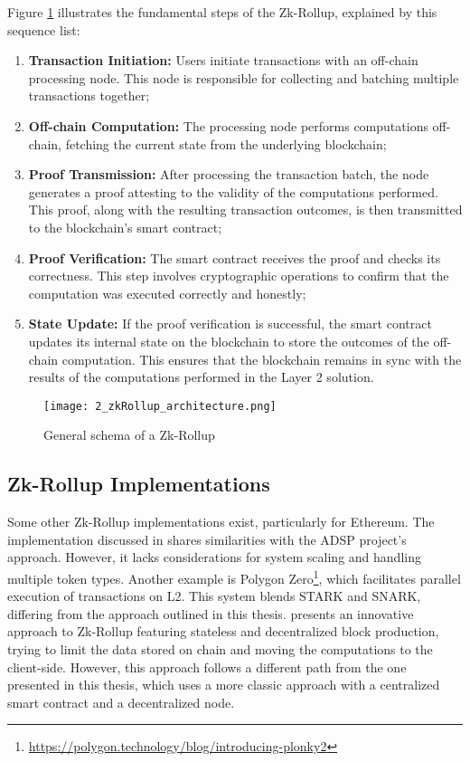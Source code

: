 Figure \ref{fig:2_zkRollup_schema} illustrates the fundamental steps of the Zk-Rollup, explained by this sequence list:
\begin{enumerate}
  \item \textbf{Transaction Initiation:} Users initiate transactions with an off-chain processing node. This node is responsible for collecting and batching multiple transactions together;
  \item \textbf{Off-chain Computation:} The processing node performs computations off-chain, fetching the current state from the underlying blockchain;
  \item \textbf{Proof Transmission:} After processing the transaction batch, the node generates a proof attesting to the validity of the computations performed. This proof, along with the resulting transaction outcomes, is then transmitted to the blockchain's smart contract;
  \item \textbf{Proof Verification:} The smart contract receives the proof and checks its correctness. This step involves cryptographic operations to confirm that the computation was executed correctly and honestly;
  \item \textbf{State Update:} If the proof verification is successful, the smart contract updates its internal state on the blockchain to store the outcomes of the off-chain computation. This ensures that the blockchain remains in sync with the results of the computations performed in the Layer 2 solution.
\end{enumerate}

\begin{figure}[ht]
  \centering
  \texttt{[image: 2\_zkRollup\_architecture.png]}
  \caption[Zk-Rollup Schema]{General schema of a Zk-Rollup\cite{ise_department_tub_material_nodate}}  
  \label{fig:2_zkRollup_schema}
\end{figure}

\subsection{Zk-Rollup Implementations}
Some other Zk-Rollup implementations exist, particularly for Ethereum. The implementation discussed in \cite{dinh_implementation_2023} shares similarities with the ADSP project's approach. However, it lacks considerations for system scaling and handling multiple token types. Another example is Polygon Zero\footnote{\url{https://polygon.technology/blog/introducing-plonky2}}, which facilitates parallel execution of transactions on L2. This system blends STARK and SNARK, differing from the approach outlined in this thesis. \cite{rybakken_intmax2_2023} presents an innovative approach to Zk-Rollup featuring stateless and decentralized block production, trying to limit the data stored on chain and moving the computations to the client-side. However, this approach follows a different path from the one presented in this thesis, which uses a more classic approach with a centralized smart contract and a decentralized node.


